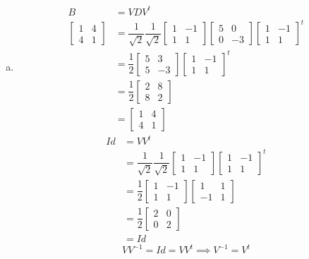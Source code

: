 \documentclass[12pt]{article}
\begin{document}
\begin{enumerate}[(a)]
	\item 
		\begin{align*}
			B &= VDV^t\\
			\begin{bmatrix}
				1 & 4\\
				4 & 1
			\end{bmatrix}
				&= \dfrac{1}{\sqrt{2}}\dfrac{1}{\sqrt{2}}
				\begin{bmatrix}
					1 & -1\\
					1 & 1
				\end{bmatrix}
				\begin{bmatrix}
					5 & 0\\
					0 & -3
				\end{bmatrix}
				\begin{bmatrix}
					1 & -1\\
					1 & 1
				\end{bmatrix}^t\\
			&= \dfrac{1}{2}
				\begin{bmatrix}
					5 & 3\\
					5 & -3
				\end{bmatrix}
				\begin{bmatrix}
					1 & -1\\
					1 & 1
				\end{bmatrix}^t\\
			&= \dfrac{1}{2}
				\begin{bmatrix}
					2 & 8 \\
					8 & 2
				\end{bmatrix}\\
			&= 
				\begin{bmatrix}
					1 & 4 \\
					4 & 1
				\end{bmatrix}
		\end{align*}
		\begin{align*}
			Id &= VV^t\\
			&= \dfrac{1}{\sqrt{2}}\dfrac{1}{\sqrt{2}}
				\begin{bmatrix}
					1 & -1\\
					1 & 1
				\end{bmatrix}
				\begin{bmatrix}
					1 & -1\\
					1 & 1
				\end{bmatrix}^t\\
			&= \dfrac{1}{2}
				\begin{bmatrix}
					1 & -1\\
					1 & 1
				\end{bmatrix}
				\begin{bmatrix}
					1 & 1\\
					-1 & 1
				\end{bmatrix}\\
			&= \dfrac{1}{2}
				\begin{bmatrix}
					2 & 0\\
					0 & 2
				\end{bmatrix}\\
			&= Id
		\end{align*}
	\[ VV^{-1} = Id = VV^t \implies V^{-1} = V^t \]


\end{enumerate}
\end{document}
